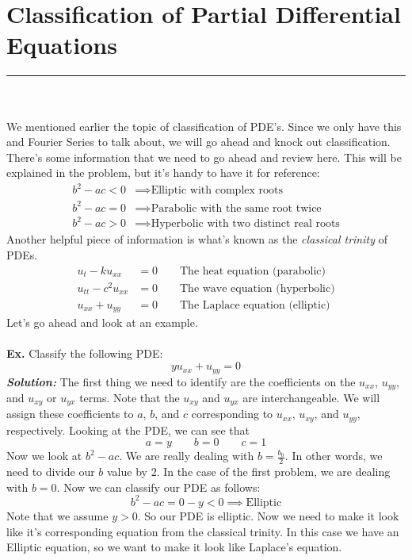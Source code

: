 \section{Classification of Partial Differential Equations}
\hrule
\noindent\\\\
\indent We mentioned earlier the topic of classification of PDE's. Since we only
have this and Fourier Series to talk about, we will go ahead and knock out
classification. There's some information that we need to go ahead and review
here. This will be explained in the problem, but it's handy to have it for
reference:
\begin{align*}
b^{2} - ac < 0 &\implies \text{Elliptic with complex roots}\\
b^{2} - ac = 0 &\implies \text{Parabolic with the same root twice}\\
b^{2} - ac > 0 &\implies \text{Hyperbolic with two distinct real roots}
\end{align*}
\noindent Another helpful piece of information is what's known as the
\textit{classical trinity} of PDEs.
\begin{align*}
u_{t} - ku_{xx} &= 0 \qquad \text{The heat equation (parabolic)}\\
u_{tt} - c^{2}u_{xx} &= 0 \qquad \text{The wave equation (hyperbolic)}\\
u_{xx} + u_{yy} &= 0 \qquad \text{The Laplace equation (elliptic)}
\end{align*}
Let's go ahead and look at an example.\\\\
\indent \textbf{Ex. }Classify the following PDE:
\[yu_{xx} + u_{yy} = 0\]
\indent \textbf{\textit{Solution:}} The first thing we need to identify are the
coefficients on the $u_{xx}$, $u_{yy}$, and $u_{xy}$ or $u_{yx}$ terms. Note
that the $u_{xy}$ and $u_{yx}$ are interchangeable. We will assign these
coefficients to $a$, $b$, and $c$ corresponding to $u_{xx}$, $u_{xy}$, and
$u_{yy}$, respectively. Looking at the PDE, we can see that
\[
a = y \qquad b = 0 \qquad c = 1
\]
\noindent Now we look at $b^{2} - ac$. We are really dealing with
$b = \frac{b_{0}}{2}$. In other words, we need to divide our $b$ value by $2$.
In the case of the first problem, we are dealing with $b = 0$. Now we can
classify our PDE as follows:
\[
b^{2} - ac = 0 - y < 0 \implies \text{Elliptic}
\]
Note that we assume $y > 0$. So our PDE is elliptic. Now we need to make it look
like it's corresponding equation from the classical trinity. In this case we
have an Elliptic equation, so we want to make it look like Laplace's equation.
